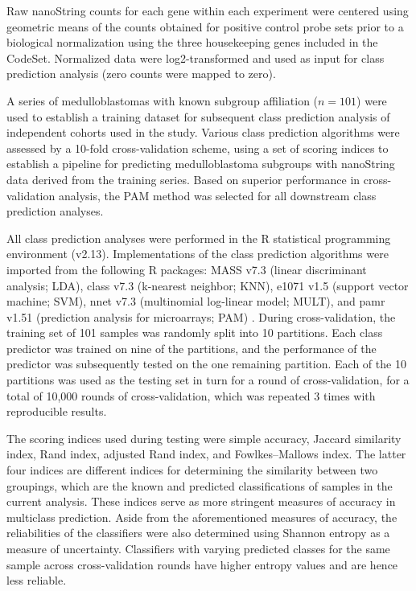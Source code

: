 Raw nanoString counts for each gene within each experiment were centered using geometric means of the counts obtained for positive control probe sets prior to a biological normalization using the three housekeeping genes included in the CodeSet.  Normalized data were log2-transformed and used as input for class prediction analysis (zero counts were mapped to zero).

A series of medulloblastomas with known subgroup affiliation ($n = 101$) were used to establish a training dataset for subsequent class prediction analysis of independent cohorts used in the study. Various class prediction algorithms were assessed by a 10-fold cross-validation scheme, using a set of scoring indices to establish a pipeline for predicting medulloblastoma subgroups with nanoString data derived from the training series. Based on superior performance in cross-validation analysis, the PAM method was selected for all downstream class prediction analyses.

All class prediction analyses were performed in the R statistical programming environment (v2.13). Implementations of the class prediction algorithms were imported from the following R packages: MASS v7.3 (linear discriminant analysis; LDA), class v7.3 (k-nearest neighbor; KNN), e1071 v1.5 (support vector machine; SVM), nnet v7.3 (multinomial log-linear model; MULT), and pamr v1.51 (prediction analysis for microarrays; PAM) . During cross-validation, the training set of 101 samples was randomly split into 10 partitions. Each class predictor was trained on nine of the partitions, and the performance of the predictor was subsequently tested on the one remaining partition. Each of the 10 partitions was used as the testing set in turn for a round of cross-validation, for a total of 10,000 rounds of cross-validation, which was repeated 3 times with reproducible results.

The scoring indices used during testing were simple accuracy, Jaccard similarity index, Rand index, adjusted Rand index, and Fowlkes–Mallows index. The latter four indices are different indices for determining the similarity between two groupings, which are the known and predicted classifications of samples in the current analysis. These indices serve as more stringent measures of accuracy in multiclass prediction. Aside from the aforementioned measures of accuracy, the reliabilities of the classifiers were also determined using Shannon entropy as a measure of uncertainty. Classifiers with varying predicted classes for the same sample across cross-validation rounds have higher entropy values and are hence less reliable.


